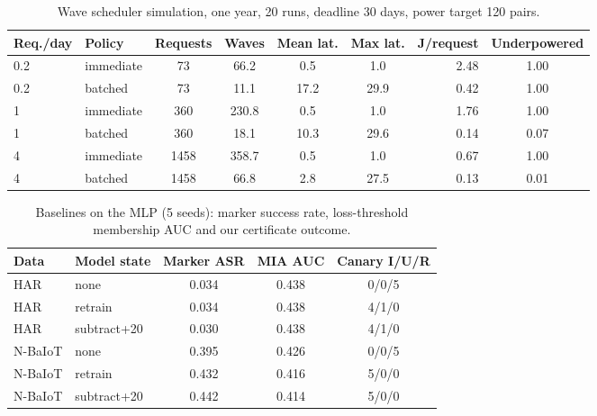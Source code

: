 \begin{table}[h]
\centering
\caption{Wave scheduler simulation, one year, 20 runs, deadline 30 days, power target 120 pairs.}\label{tab:s_sched}
\footnotesize
\setlength{\tabcolsep}{3pt}
\begin{tabular}{@{}llccccrc@{}}
\toprule
Req./day & Policy & Requests & Waves & Mean lat. & Max lat. & J/request & Underpowered \\
\midrule
0.2 & immediate & 73 & 66.2 & 0.5 & 1.0 & 2.48 & 1.00 \\
0.2 & batched & 73 & 11.1 & 17.2 & 29.9 & 0.42 & 1.00 \\
1 & immediate & 360 & 230.8 & 0.5 & 1.0 & 1.76 & 1.00 \\
1 & batched & 360 & 18.1 & 10.3 & 29.6 & 0.14 & 0.07 \\
4 & immediate & 1458 & 358.7 & 0.5 & 1.0 & 0.67 & 1.00 \\
4 & batched & 1458 & 66.8 & 2.8 & 27.5 & 0.13 & 0.01 \\
\bottomrule
\end{tabular}
\end{table}

\begin{table}[h]
\centering
\caption{Baselines on the MLP (5 seeds): marker success rate, loss-threshold membership AUC and our certificate outcome.}\label{tab:s_base}
\footnotesize
\setlength{\tabcolsep}{3pt}
\begin{tabular}{@{}llccc@{}}
\toprule
Data & Model state & Marker ASR & MIA AUC & Canary I/U/R \\
\midrule
HAR & none & 0.034 & 0.438 & 0/0/5 \\
HAR & retrain & 0.034 & 0.438 & 4/1/0 \\
HAR & subtract+20 & 0.030 & 0.438 & 4/1/0 \\
N-BaIoT & none & 0.395 & 0.426 & 0/0/5 \\
N-BaIoT & retrain & 0.432 & 0.416 & 5/0/0 \\
N-BaIoT & subtract+20 & 0.442 & 0.414 & 5/0/0 \\
\bottomrule
\end{tabular}
\end{table}

